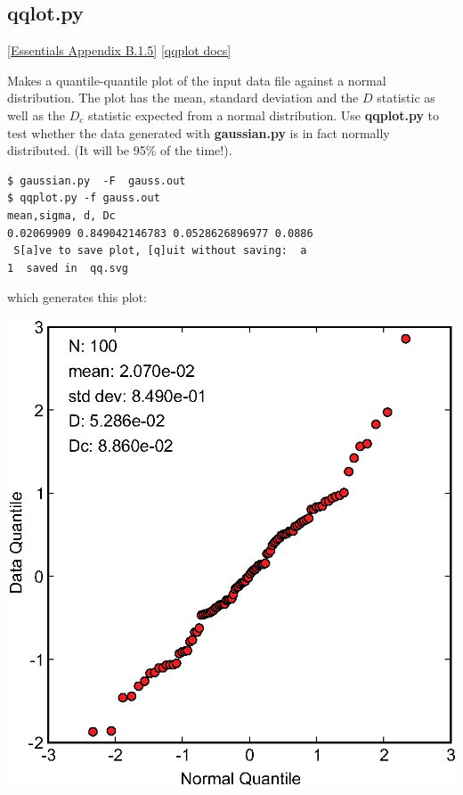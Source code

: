 \documentclass[11pt]{book}
\begin{document}
{{

\subsection{qqlot.py} \href{http://earthref.org/MAGIC/books/Tauxe/Essentials/WebBook3ap2.html#quantile_quantile_plots}{[Essentials Appendix B.1.5]}
\href{https://github.com/PmagPy/PmagPy/blob/master/programs/qqplot.py}{[qqplot docs]}


Makes a quantile-quantile plot  of the input data file against a normal distribution.
The plot has the mean, standard deviation and the $D$ statistic as well as the $D_c$ statistic expected from
a normal distribution.  Use {\bf qqplot.py} to test whether the data generated with {\bf gaussian.py} is in fact normally distributed.
(It will be 95\% of the time!).

\begin{verbatim}
$ gaussian.py  -F  gauss.out
$ qqplot.py -f gauss.out
mean,sigma, d, Dc
0.02069909 0.849042146783 0.0528626896977 0.0886
 S[a]ve to save plot, [q]uit without saving:  a
1  saved in  qq.svg
\end{verbatim}

\noindent which generates this plot:

{%
\includegraphics[width=12 cm]{EPSfiles/qq.eps}}

}}
\end{document}
